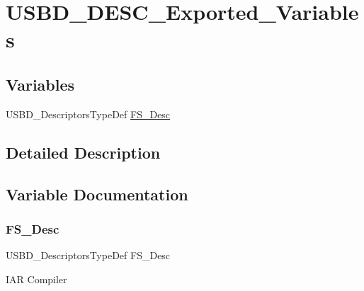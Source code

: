 \hypertarget{group__USBD__DESC__Exported__Variables}{}\section{U\+S\+B\+D\+\_\+\+D\+E\+S\+C\+\_\+\+Exported\+\_\+\+Variables}
\label{group__USBD__DESC__Exported__Variables}
\subsection*{Variables}
\begin{DoxyCompactItemize}
\item 
U\+S\+B\+D\+\_\+\+Descriptors\+Type\+Def \hyperlink{group__USBD__DESC__Exported__Variables_gae36d67393118d9d8531a8d633e23a797}{F\+S\+\_\+\+Desc}
\end{DoxyCompactItemize}


\subsection{Detailed Description}


\subsection{Variable Documentation}
\mbox{\label{group__USBD__DESC__Exported__Variables_gae36d67393118d9d8531a8d633e23a797}} 
\subsubsection{\texorpdfstring{F\+S\+\_\+\+Desc}{FS\_Desc}}
{\footnotesize\ttfamily U\+S\+B\+D\+\_\+\+Descriptors\+Type\+Def F\+S\+\_\+\+Desc}

I\+AR Compiler 